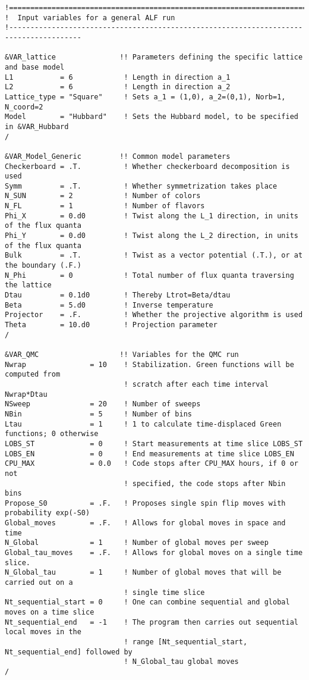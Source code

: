 \begin{lstlisting}[style=fortran,escapechar=\#,breaklines=true]
!=======================================================================================
!  Input variables for a general ALF run
!---------------------------------------------------------------------------------------

&VAR_lattice               !! Parameters defining the specific lattice and base model
L1           = 6            ! Length in direction a_1
L2           = 6            ! Length in direction a_2
Lattice_type = "Square"     ! Sets a_1 = (1,0), a_2=(0,1), Norb=1, N_coord=2
Model        = "Hubbard"    ! Sets the Hubbard model, to be specified in &VAR_Hubbard
/

&VAR_Model_Generic         !! Common model parameters
Checkerboard = .T.          ! Whether checkerboard decomposition is used
Symm         = .T.          ! Whether symmetrization takes place
N_SUN        = 2            ! Number of colors
N_FL         = 1            ! Number of flavors
Phi_X        = 0.d0         ! Twist along the L_1 direction, in units of the flux quanta
Phi_Y        = 0.d0         ! Twist along the L_2 direction, in units of the flux quanta
Bulk         = .T.          ! Twist as a vector potential (.T.), or at the boundary (.F.)
N_Phi        = 0            ! Total number of flux quanta traversing the lattice
Dtau         = 0.1d0        ! Thereby Ltrot=Beta/dtau
Beta         = 5.d0         ! Inverse temperature
Projector    = .F.          ! Whether the projective algorithm is used
Theta        = 10.d0        ! Projection parameter
/

&VAR_QMC                   !! Variables for the QMC run
Nwrap               = 10    ! Stabilization. Green functions will be computed from 
                            ! scratch after each time interval Nwrap*Dtau
NSweep              = 20    ! Number of sweeps
NBin                = 5     ! Number of bins
Ltau                = 1     ! 1 to calculate time-displaced Green functions; 0 otherwise
LOBS_ST             = 0     ! Start measurements at time slice LOBS_ST
LOBS_EN             = 0     ! End measurements at time slice LOBS_EN
CPU_MAX             = 0.0   ! Code stops after CPU_MAX hours, if 0 or not
                            ! specified, the code stops after Nbin bins
Propose_S0          = .F.   ! Proposes single spin flip moves with probability exp(-S0) 
Global_moves        = .F.   ! Allows for global moves in space and time 
N_Global            = 1     ! Number of global moves per sweep 
Global_tau_moves    = .F.   ! Allows for global moves on a single time slice.  
N_Global_tau        = 1     ! Number of global moves that will be carried out on a 
                            ! single time slice
Nt_sequential_start = 0     ! One can combine sequential and global moves on a time slice
Nt_sequential_end   = -1    ! The program then carries out sequential local moves in the
                            ! range [Nt_sequential_start, Nt_sequential_end] followed by
                            ! N_Global_tau global moves
/


\end{lstlisting}
